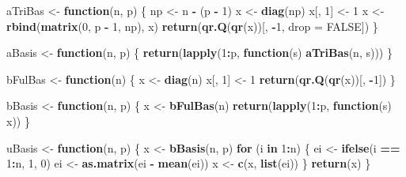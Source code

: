 \documentclass[
  12pt,
]{article}
\newenvironment{Shaded}{\begin{snugshade}}{\end{snugshade}}
\newcommand{\AttributeTok}[1]{\textcolor[rgb]{0.13,0.29,0.53}{#1}}
\newcommand{\ConstantTok}[1]{\textcolor[rgb]{0.56,0.35,0.01}{#1}}
\newcommand{\ControlFlowTok}[1]{\textcolor[rgb]{0.13,0.29,0.53}{\textbf{#1}}}
\newcommand{\DecValTok}[1]{\textcolor[rgb]{0.00,0.00,0.81}{#1}}
\newcommand{\FunctionTok}[1]{\textcolor[rgb]{0.13,0.29,0.53}{\textbf{#1}}}
\newcommand{\NormalTok}[1]{#1}
\newcommand{\OtherTok}[1]{\textcolor[rgb]{0.56,0.35,0.01}{#1}}
\newcommand{\SpecialCharTok}[1]{\textcolor[rgb]{0.81,0.36,0.00}{\textbf{#1}}}
\begin{document}
\begin{Shaded}
\begin{Highlighting}[]
\NormalTok{aTriBas }\OtherTok{\textless{}{-}} \ControlFlowTok{function}\NormalTok{(n, p) \{}
\NormalTok{  np }\OtherTok{\textless{}{-}}\NormalTok{ n }\SpecialCharTok{{-}}\NormalTok{ (p }\SpecialCharTok{{-}} \DecValTok{1}\NormalTok{)}
\NormalTok{  x }\OtherTok{\textless{}{-}} \FunctionTok{diag}\NormalTok{(np)}
\NormalTok{  x[, }\DecValTok{1}\NormalTok{] }\OtherTok{\textless{}{-}} \DecValTok{1}
\NormalTok{  x }\OtherTok{\textless{}{-}} \FunctionTok{rbind}\NormalTok{(}\FunctionTok{matrix}\NormalTok{(}\DecValTok{0}\NormalTok{, p }\SpecialCharTok{{-}} \DecValTok{1}\NormalTok{, np), x)}
  \FunctionTok{return}\NormalTok{(}\FunctionTok{qr.Q}\NormalTok{(}\FunctionTok{qr}\NormalTok{(x))[, }\SpecialCharTok{{-}}\DecValTok{1}\NormalTok{, }\AttributeTok{drop =} \ConstantTok{FALSE}\NormalTok{])}
\NormalTok{\}}

\NormalTok{aBasis }\OtherTok{\textless{}{-}} \ControlFlowTok{function}\NormalTok{(n, p) \{}
  \FunctionTok{return}\NormalTok{(}\FunctionTok{lapply}\NormalTok{(}\DecValTok{1}\SpecialCharTok{:}\NormalTok{p, }\ControlFlowTok{function}\NormalTok{(s)}
    \FunctionTok{aTriBas}\NormalTok{(n, s)))}
\NormalTok{\}}

\NormalTok{bFulBas }\OtherTok{\textless{}{-}} \ControlFlowTok{function}\NormalTok{(n) \{}
\NormalTok{  x }\OtherTok{\textless{}{-}} \FunctionTok{diag}\NormalTok{(n)}
\NormalTok{  x[, }\DecValTok{1}\NormalTok{] }\OtherTok{\textless{}{-}} \DecValTok{1}
  \FunctionTok{return}\NormalTok{(}\FunctionTok{qr.Q}\NormalTok{(}\FunctionTok{qr}\NormalTok{(x))[, }\SpecialCharTok{{-}}\DecValTok{1}\NormalTok{])}
\NormalTok{\}}

\NormalTok{bBasis }\OtherTok{\textless{}{-}} \ControlFlowTok{function}\NormalTok{(n, p) \{}
\NormalTok{  x }\OtherTok{\textless{}{-}} \FunctionTok{bFulBas}\NormalTok{(n)}
  \FunctionTok{return}\NormalTok{(}\FunctionTok{lapply}\NormalTok{(}\DecValTok{1}\SpecialCharTok{:}\NormalTok{p, }\ControlFlowTok{function}\NormalTok{(s)}
\NormalTok{    x))}
\NormalTok{\}}

\NormalTok{uBasis }\OtherTok{\textless{}{-}} \ControlFlowTok{function}\NormalTok{(n, p) \{}
\NormalTok{  x }\OtherTok{\textless{}{-}} \FunctionTok{bBasis}\NormalTok{(n, p)}
  \ControlFlowTok{for}\NormalTok{ (i }\ControlFlowTok{in} \DecValTok{1}\SpecialCharTok{:}\NormalTok{n) \{}
\NormalTok{    ei }\OtherTok{\textless{}{-}} \FunctionTok{ifelse}\NormalTok{(i }\SpecialCharTok{==} \DecValTok{1}\SpecialCharTok{:}\NormalTok{n, }\DecValTok{1}\NormalTok{, }\DecValTok{0}\NormalTok{)}
\NormalTok{    ei }\OtherTok{\textless{}{-}} \FunctionTok{as.matrix}\NormalTok{(ei }\SpecialCharTok{{-}} \FunctionTok{mean}\NormalTok{(ei))}
\NormalTok{    x }\OtherTok{\textless{}{-}} \FunctionTok{c}\NormalTok{(x, }\FunctionTok{list}\NormalTok{(ei))}
\NormalTok{  \}}
  \FunctionTok{return}\NormalTok{(x)}
\NormalTok{\}}


\end{Highlighting}
\end{Shaded}
\end{document}
